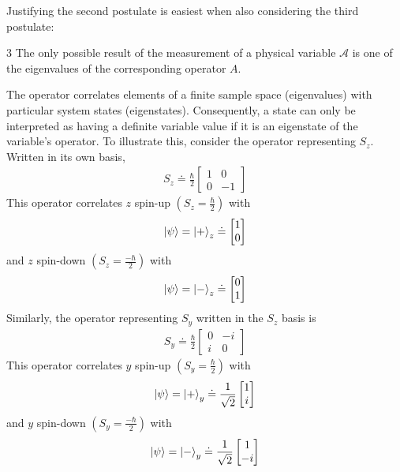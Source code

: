Justifying the second postulate is easiest when also considering the third postulate:
\begin{Thm:Postulate}{3}
    The only possible result of the measurement of a physical variable $\mathcal{A}$ is one of the eigenvalues of the corresponding operator $A$.
\end{Thm:Postulate}

The operator correlates elements of a finite sample space (eigenvalues) with particular system states (eigenstates). Consequently, a state can only be interpreted as having a definite variable value if it is an eigenstate of the variable's operator. To illustrate this, consider the operator representing $S_z$. Written in its own basis,
\begin{align*}
    S_z \doteq \frac{\hbar}{2}\begin{bmatrix} 1 & 0 \\ 0 & -1 \end{bmatrix}
\end{align*}
This operator correlates $z$ spin-up $\left(S_z = \frac{\hbar}{2}\right)$ with
\begin{align*}
    \ket{\psi} = \ket{+}_z \doteq \begin{bmatrix} 1 \\ 0 \end{bmatrix}
\end{align*}
and $z$ spin-down $\left(S_z = \frac{-\hbar}{2}\right)$ with
\begin{align*}
    \ket{\psi} = \ket{-}_z \doteq \begin{bmatrix} 0 \\ 1 \end{bmatrix}
\end{align*}
Similarly, the operator representing $S_y$ written in the $S_z$ basis is
\begin{align*}
        S_y \doteq \frac{\hbar}{2}\begin{bmatrix} 0 & -i \\ i & 0 \end{bmatrix}
\end{align*}
This operator correlates $y$ spin-up $\left(S_y = \frac{\hbar}{2}\right)$ with
\begin{align*}
    \ket{\psi} = \ket{+}_y \doteq \frac{1}{\sqrt{2}}\begin{bmatrix} 1 \\ i \end{bmatrix}
\end{align*}
and $y$ spin-down $\left(S_y = \frac{-\hbar}{2}\right)$ with
\begin{align*}
    \ket{\psi} = \ket{-}_y \doteq \frac{1}{\sqrt{2}}\begin{bmatrix} 1 \\ -i \end{bmatrix}
\end{align*}

